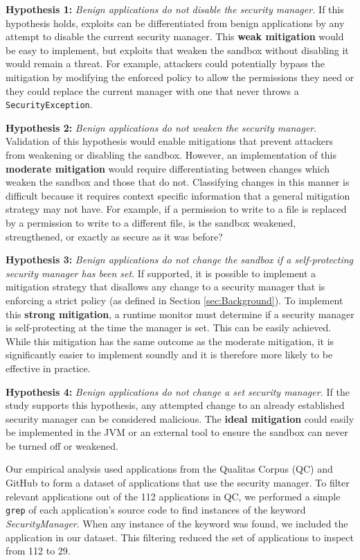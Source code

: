 \documentclass{sig-alternate}
\begin{document}
\textbf{Hypothesis 1:} \textit{Benign applications do not disable
the security manager.} If this hypothesis holds, exploits can be differentiated
from benign applications by any attempt to disable the current security
manager. This \textbf{weak mitigation} would be easy to implement,
but exploits that weaken the sandbox without disabling it would remain
a threat. For example, attackers could potentially bypass the mitigation
by modifying the enforced policy to allow the permissions they need
or they could replace the current manager with one that never throws
a \texttt{SecurityException}.

\textbf{Hypothesis 2:} \emph{Benign applications do not weaken the
s}\textit{ecurity manager}. Validation of this hypothesis would enable
mitigations that prevent attackers from weakening or disabling the
sandbox. However, an implementation of this \textbf{moderate mitigation}
would require differentiating between changes which weaken the sandbox
and those that do not. Classifying changes in this manner is difficult
because it requires context specific information that a general mitigation
strategy may not have. For example, if a permission to write to a
file is replaced by a permission to write to a different file, is
the sandbox weakened, strengthened, or exactly as secure as it was
before?

\textbf{Hypothesis 3:} \textit{Benign applications do not change the
sandbox if a self-protecting security manager has been set}. If supported,
it is possible to implement a mitigation strategy that disallows any
change to a security manager that is enforcing a strict policy (as
defined in Section \ref{sec:Background}). To implement this \textbf{strong
mitigation}, a runtime monitor must determine if a security manager
is self-protecting at the time the manager is set. This can be easily
achieved. While this mitigation has the same outcome as the moderate
mitigation, it is significantly easier to implement soundly and it
is therefore more likely to be effective in practice. 

\textbf{Hypothesis 4:} \textit{Benign applications do not change a
set security manager.} If the study supports this hypothesis, any
attempted change to an already established security manager can be
considered malicious. The \textbf{ideal mitigation} could easily be
implemented in the JVM or an external tool to ensure the sandbox can
never be turned off or weakened. 

Our empirical analysis used applications from the Qualitas Corpus
(QC) \cite{QualitasCorpus:APSEC:2010} and GitHub to form a dataset
of applications that use the security manager. To filter relevant
applications out of the 112 applications in QC, we performed a simple
\texttt{grep} of each application's source code to find instances
of the keyword \textit{SecurityManager}. When any instance of the
keyword was found, we included the application in our dataset. This
filtering reduced the set of applications to inspect from 112 to 29.
\end{document}
